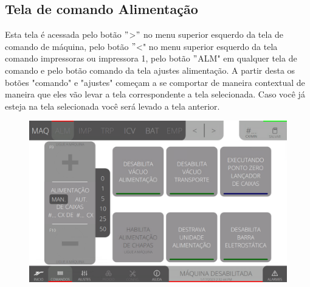 \thispagestyle{fancy}
\vspace*{40 pt}
\subsection{Tela de comando Alimentação}
Esta tela é acessada pelo botão \("\)\textgreater\("\) no menu superior esquerdo da tela de comando de máquina, pelo botão \("\)\textless{}" no menu superior esquerdo da tela comando impressoras ou impressora 1, pelo botão \("\)ALM" em qualquer tela de comando e pelo botão comando da tela ajustes alimentação. A partir desta os botões "comando" e "ajustes" começam a se comportar de maneira contextual de maneira que eles vão levar a tela correspondente a tela selecionada. Caso você já esteja na tela selecionada você será levado a tela anterior.
\vspace*{\fill}
\begin{figure}[h]
    \centering
    \includegraphics[width=480 px,height=300 px]{src/imagesICV/03-feeder/commands/1.png}
\end{figure}
\vspace*{\fill}

\newpage
\thispagestyle{fancy}
\vspace*{40 pt}
